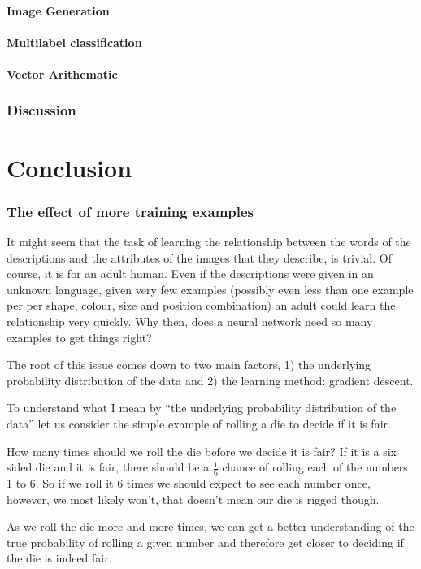 \paragraph{Image Generation}
\paragraph{Multilabel classification}
\paragraph{Vector Arithematic}

\subsubsection{Discussion}

\section{Conclusion}

\subsubsection{The effect of  more training examples}
It might seem that the task of learning the relationship between the words of the descriptions and the attributes of the images that they describe, is trivial. Of course, it is for an adult human. Even if the descriptions were given in an unknown language, given very few examples (possibly even less than one example per per shape, colour, size and position combination) an adult could learn the relationship very quickly. Why then, does a neural network need so many examples to get things right?

The root of this issue comes down to two main factors, 1) the underlying probability distribution of the data and 2) the learning method: gradient descent.

To understand what I mean by ``the underlying probability distribution of the data'' let us consider the simple example of rolling a die to decide if it is fair.

How many times should we roll the die before we decide it is fair? If it is a six sided die and it is fair, there should be a $\frac{1}{6}$ chance of rolling each of the numbers 1 to 6. So if we roll it 6 times we should expect to see each number once, however, we most likely won't, that doesn't mean our die is rigged though.

As we roll the die more and more times, we can get a better understanding of the true probability of rolling a given number and therefore get closer to deciding if the die is indeed fair.

